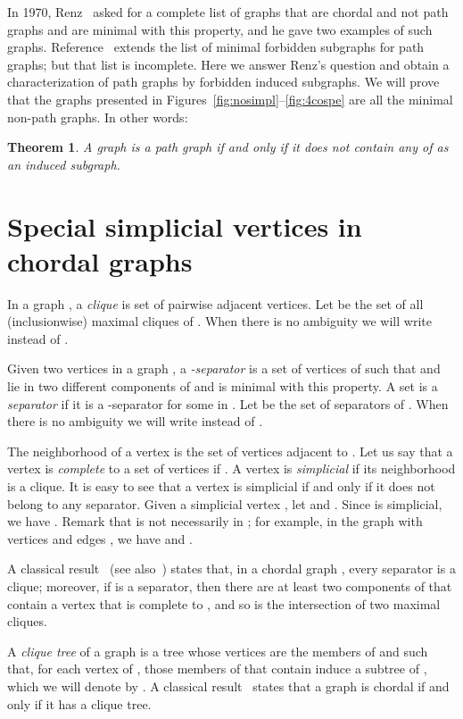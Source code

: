 \documentclass[11pt]{article}
\newtheorem{theorem}{Theorem}
\begin{document}
In 1970, Renz~\cite{Ren70} asked for a complete list of graphs that
are chordal and not path graphs and are minimal with this property,
and he gave two examples of such graphs.  Reference~\cite{TonGutSzw05}
extends the list of minimal forbidden subgraphs for path graphs; but
that list is incomplete.  Here we answer Renz's question and obtain a
characterization of path graphs by forbidden induced subgraphs.  We
will prove that the graphs presented in
Figures~\ref{fig:nosimpl}--\ref{fig:4cospe} are all the minimal
non-path graphs.  In other words:
\begin{theorem}
    \label{th:main}
    A graph is a path graph if and only if it does not contain any of
     as an induced subgraph.
\end{theorem}



\section{Special simplicial vertices in chordal graphs}

In a graph , a \emph{clique} is set of pairwise adjacent vertices.
Let  be the set of all (inclusionwise) maximal cliques
of .  When there is no ambiguity we will write  instead
of .

Given two vertices  in a graph , a \emph{-separator}
is a set  of vertices of  such that  and  lie in two
different components of  and  is minimal with this
property.  A set is a \emph{separator} if it is a -separator
for some  in .  Let  be the set of separators
of .  When there is no ambiguity we will write  instead
of .

The neighborhood of a vertex  is the set  of vertices
adjacent to .  Let us say that a vertex  is \emph{complete} to a
set  of vertices if .  A vertex is
\emph{simplicial} if its neighborhood is a clique.  It is easy to see
that a vertex is simplicial if and only if it does not belong to any
separator.  Given a simplicial vertex , let  and
.  Since  is simplicial, we have
.  Remark that  is not necessarily in
; for example, in the graph  with vertices  and edges , we have  and
.

A classical result~\cite{HajSur58,Ber60} (see also~\cite{Gol04})
states that, in a chordal graph , every separator is a clique;
moreover, if  is a separator, then there are at least two
components of  that contain a vertex that is complete to
, and so  is the intersection of two maximal cliques.

A \emph{clique tree}  of a graph  is a tree whose vertices are
the members of  and such that, for each vertex  of ,
those members of  that contain  induce a subtree of
, which we will denote by .  A classical result~\cite{Gav74}
states that a graph is chordal if and only if it has a clique tree.
\end{document}
